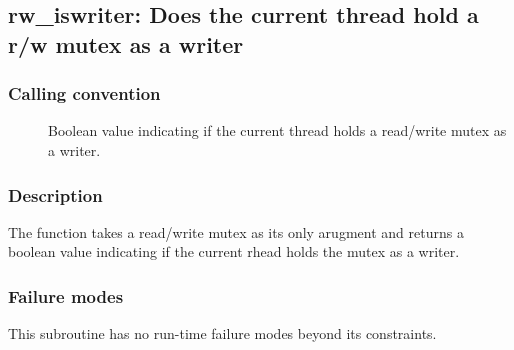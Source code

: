 \clearpage
{}
{}
\label{subr:rw_iswriter}
\subsection*{rw\_iswriter: Does the current thread hold a r/w mutex as
  a writer}

\subsubsection*{Calling convention}

\begin{description}
\item[] Boolean value indicating if the current thread
  holds a read/write mutex as a writer.
\end{description}

\subsubsection*{Description}

The  function takes a read/write mutex as its
only arugment and returns a boolean value indicating if the current
rhead holds the mutex as a writer.

\subsubsection*{Failure modes}

This subroutine has no run-time failure modes beyond its constraints.
